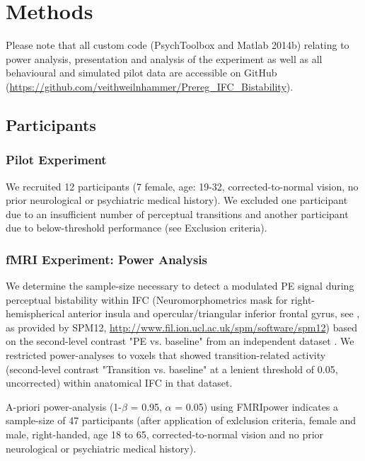 \documentclass[12pt]{article}
\begin{document}
\section{Methods}

Please note that all custom code (PsychToolbox and Matlab 2014b) relating to power analysis, presentation and analysis of the experiment as well as all behavioural and simulated pilot data are accessible on GitHub (\url{https://github.com/veithweilnhammer/Prereg_IFC_Bistability}).

\subsection{Participants}

\subsubsection{Pilot Experiment}

We recruited 12 participants (7 female, age: 19-32, corrected-to-normal vision, no prior neurological or psychiatric medical history). We excluded one participant due to an insufficient number of perceptual transitions and another participant due to below-threshold performance (see Exclusion criteria).

\subsubsection{fMRI Experiment: Power Analysis}

We determine the sample-size necessary to detect a modulated PE signal during perceptual bistability within IFC (Neuromorphometrics mask for right-hemispherical anterior insula and opercular/triangular inferior frontal gyrus, see \cite{Brascamp2018}, as provided by SPM12, \url{http://www.fil.ion.ucl.ac.uk/spm/software/spm12}) based on the second-level contrast "PE vs. baseline" from an independent dataset \parencite{Weilnhammer2017}. We restricted power-analyses to voxels that showed transition-related activity (second-level contrast "Transition vs. baseline" at a lenient threshold of 0.05, uncorrected) within anatomical IFC in that dataset. 

A-priori power-analysis (1-$\beta$ = 0.95, $\alpha$ = 0.05) using FMRIpower \parencite{Mumford2008} indicates a sample-size of 47 participants (after application of exlclusion criteria, female and male, right-handed, age 18 to 65, corrected-to-normal vision and no prior neurological or psychiatric medical history). 
\end{document}
